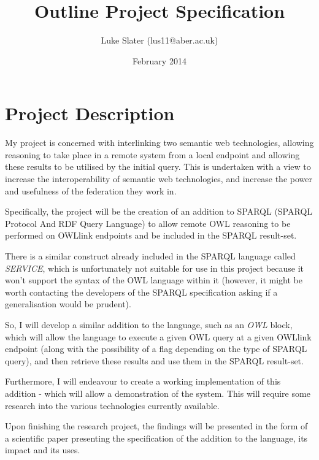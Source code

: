 \documentclass{article}
\begin{document}
\setlength{\parskip}{\medskipamount}
\setlength{\parindent}{0pt}

\title{Outline Project Specification}
\author{Luke Slater (lus11@aber.ac.uk)}
\date{February 2014}

\maketitle

\pagebreak

\section{Project Description}

My project is concerned with interlinking two semantic web technologies,
allowing reasoning to take place in a remote system from a local endpoint and
allowing these results to be utilised by the initial query. This is undertaken
with a view to increase the interoperability of semantic web technologies, and
increase the power and usefulness of the federation they work in.

Specifically, the project will be the creation of an addition to
SPARQL\cite{sparql} (SPARQL Protocol And RDF Query Language) to allow remote
OWL\cite{owlprimer} reasoning to be performed on OWLlink endpoints and be included in the
SPARQL result-set.

There is a similar construct already included in the SPARQL language called
\emph{SERVICE}, which is unfortunately not suitable for use in this project
because it won't support the syntax of the OWL language within it (however, it
might be worth contacting the developers of the SPARQL specification asking if a
generalisation would be prudent).

So, I will develop a similar addition to the language, such as an \emph{OWL}
block, which will allow the language to execute a given OWL query at a given
OWLlink endpoint (along with the possibility of a flag depending on the type of
SPARQL query), and then retrieve these results and use them in the SPARQL
result-set.

Furthermore, I will endeavour to create a working implementation of this
addition - which will allow a demonstration of the system. This will require
some research into the various technologies currently available.

Upon finishing the research project, the findings will be presented in the form
of a scientific paper presenting the specification of the addition to the
language, its impact and its uses.
\end{document}
